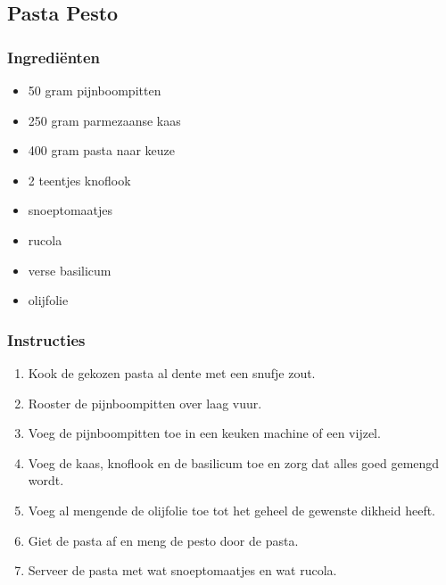 \subsection{Pasta Pesto}
\subsubsection*{Ingrediënten}
\begin{multicols}{2}
    \begin{itemize}
        \item 50 gram pijnboompitten
        \item 250 gram parmezaanse kaas
        \item 400 gram pasta naar keuze
        \item 2 teentjes knoflook
        \item snoeptomaatjes
        \item rucola
        \item verse basilicum
        \item olijfolie
    \end{itemize}
\end{multicols}

\subsubsection*{Instructies}
\begin{multicols}{2}
    \begin{enumerate}
        \item Kook de gekozen pasta al dente met een snufje zout.
        \item Rooster de pijnboompitten over laag vuur.
        \item Voeg de pijnboompitten toe in een keuken machine of een vijzel.
        \item Voeg de kaas, knoflook en de basilicum toe en zorg dat alles goed gemengd wordt.
        \item Voeg al mengende de olijfolie toe tot het geheel de gewenste dikheid heeft.
        \item Giet de pasta af en meng de pesto door de pasta.
        \item Serveer de pasta met wat snoeptomaatjes en wat rucola.
    \end{enumerate}
\end{multicols}